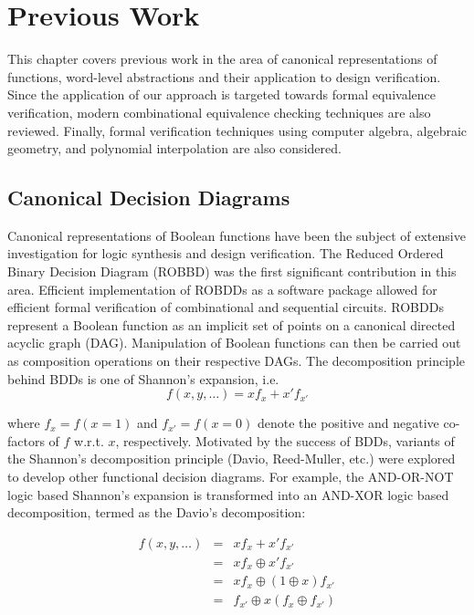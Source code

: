 \chapter{Previous Work} \label{ch:prev}

This chapter covers previous work in the area of canonical
representations of functions, word-level abstractions and their
application to design verification. Since the application of our
approach is targeted towards formal equivalence verification, modern
combinational equivalence checking techniques are also
reviewed. Finally, formal verification techniques using computer
algebra, algebraic geometry, and polynomial interpolation are also
considered. 

\section{Canonical Decision Diagrams}
Canonical representations of Boolean functions have been the subject
of extensive investigation for logic synthesis and design
verification. The Reduced Ordered Binary Decision Diagram (ROBBD)
\cite{BRYA86} was the first significant contribution in this area. 
Efficient implementation of ROBDDs as a software package \cite{brace}
allowed for efficient formal verification of combinational and
sequential circuits.  ROBDDs represent a Boolean function as an
implicit set of points on a canonical directed acyclic graph
(DAG). Manipulation of Boolean functions can then be carried out as
composition operations on their respective DAGs.  The decomposition
principle behind BDDs is one of Shannon's expansion, i.e.
\begin{equation}
f(x, y, \dots) = x f_x + x' f_{x'}
\end{equation}

where $f_x = f(x = 1)$ and $f_{x'} = f(x = 0)$ denote the positive and
negative co-factors of $f$ w.r.t. $x$, respectively. Motivated by the
success of BDDs,  variants of the Shannon's decomposition principle
(Davio, Reed-Muller, etc.) were explored to develop other functional
decision diagrams. For example, the AND-OR-NOT logic based Shannon's
expansion is transformed into an AND-XOR logic based decomposition,
termed as the Davio's decomposition:

\begin{eqnarray}
f(x, y, \dots) &=& x f_x + x' f_{x'}\\
& = & x f_x \oplus x' f_{x'}\\
& = & x f_x \oplus (1 \oplus x) f_{x'}\\
& = & f_{x'} \oplus x (f_x \oplus f_{x'})
\end{eqnarray}


